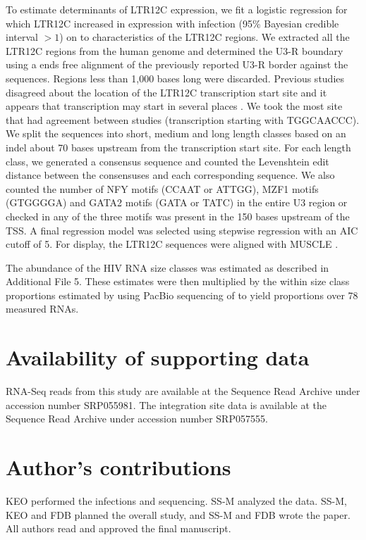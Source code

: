 \documentclass[../sherrill-Mix_thesis.tex]{subfiles}
\begin{document}
		To estimate determinants of LTR12C expression, we fit a logistic regression for which LTR12C increased in expression with \hivEight{} infection (95\% Bayesian credible interval $>1$) on to characteristics of the LTR12C regions. We extracted all the LTR12C regions from the human genome and determined the U3-R boundary using a ends free alignment of the previously reported U3-R border \citep{LaMantia1991,LaMantia1992,Plant2001,Ling2002,Yu2005} against the sequences. Regions less than 1,000 bases long were discarded. Previous studies disagreed about the location of the LTR12C transcription start site and it appears that transcription may start in several places \citep{LaMantia1992,Plant2001}. We took the \fivePrime{} most site that had agreement between studies (transcription starting with TGGCAACCC). We split the sequences into short, medium and long length classes based on an indel about 70 bases upstream from the transcription start site. For each length class, we generated a consensus sequence and counted the Levenshtein edit distance between the consensuses and each corresponding sequence. We also counted the number of NFY motifs (CCAAT or ATTGG), MZF1 motifs (GTGGGGA) and GATA2 motifs (GATA or TATC) in the entire U3 region or checked in any of the three motifs was present in the 150 bases upstream of the TSS. A final regression model was selected using stepwise regression with an AIC cutoff of 5. For display, the LTR12C sequences were aligned with MUSCLE \citep{Edgar2004}.

		The abundance of the HIV RNA size classes was estimated as described in Additional File 5. These estimates were then multiplied by the within size class proportions estimated by \citet{Ocwieja2012} using PacBio sequencing of \hivEight{} to yield proportions over 78 measured \hivEight{} RNAs.
		

\section{Availability of supporting data}
	RNA-Seq reads from this study are available at the Sequence Read Archive under accession number SRP055981. The integration site data is available at the Sequence Read Archive under accession number SRP057555.

\section{Author's contributions}
	KEO performed the infections and sequencing. SS-M analyzed the data. SS-M, KEO and FDB planned the overall study, and SS-M and FDB wrote the paper. All authors read and approved the final manuscript.
\end{document}
